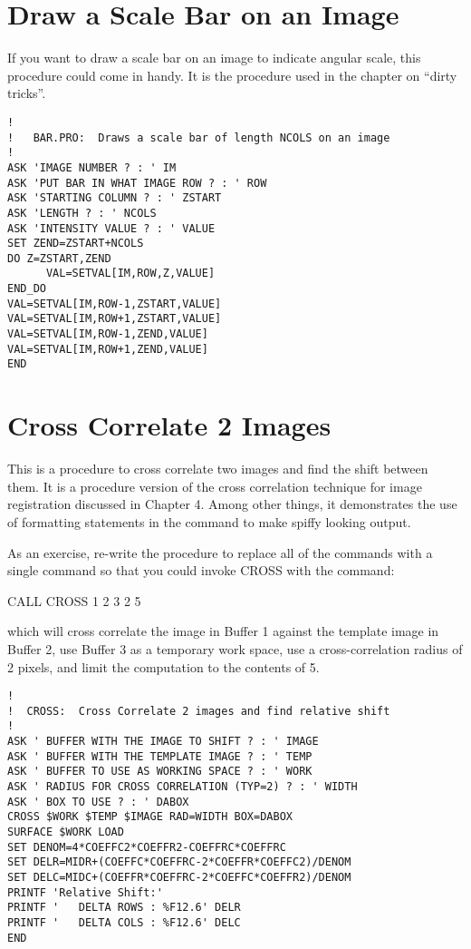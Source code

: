 
\section{Draw a Scale Bar on an Image}

If you want to draw a scale bar on an image to indicate angular scale, this
procedure could come in handy.  It is the procedure used in the
chapter on ``dirty tricks''.

\begin{verbatim}
!
!   BAR.PRO:  Draws a scale bar of length NCOLS on an image
!
ASK 'IMAGE NUMBER ? : ' IM
ASK 'PUT BAR IN WHAT IMAGE ROW ? : ' ROW
ASK 'STARTING COLUMN ? : ' ZSTART
ASK 'LENGTH ? : ' NCOLS
ASK 'INTENSITY VALUE ? : ' VALUE
SET ZEND=ZSTART+NCOLS
DO Z=ZSTART,ZEND
      VAL=SETVAL[IM,ROW,Z,VALUE]
END_DO
VAL=SETVAL[IM,ROW-1,ZSTART,VALUE]
VAL=SETVAL[IM,ROW+1,ZSTART,VALUE]
VAL=SETVAL[IM,ROW-1,ZEND,VALUE]
VAL=SETVAL[IM,ROW+1,ZEND,VALUE]
END
\end{verbatim}


\section{Cross Correlate 2 Images}

This is a procedure to cross correlate two images and find the shift between
them.  It is a procedure version of the cross correlation technique for image
registration discussed in Chapter 4.  Among other things, it demonstrates
the use of formatting statements in the  command to make
spiffy looking output.

As an exercise, re-write the procedure to replace all of the 
commands with a single  command so that you could invoke CROSS
with the command:
\begin{command}
      \item CALL CROSS 1 2 3 2 5
\end{command}
which will cross correlate the image in Buffer 1 against the template image in
Buffer 2, use Buffer 3 as a temporary work space, use a cross-correlation
radius of 2 pixels, and limit the computation to the contents of  5.

\begin{verbatim}
!
!  CROSS:  Cross Correlate 2 images and find relative shift
!
ASK ' BUFFER WITH THE IMAGE TO SHIFT ? : ' IMAGE
ASK ' BUFFER WITH THE TEMPLATE IMAGE ? : ' TEMP
ASK ' BUFFER TO USE AS WORKING SPACE ? : ' WORK
ASK ' RADIUS FOR CROSS CORRELATION (TYP=2) ? : ' WIDTH
ASK ' BOX TO USE ? : ' DABOX
CROSS $WORK $TEMP $IMAGE RAD=WIDTH BOX=DABOX
SURFACE $WORK LOAD
SET DENOM=4*COEFFC2*COEFFR2-COEFFRC*COEFFRC
SET DELR=MIDR+(COEFFC*COEFFRC-2*COEFFR*COEFFC2)/DENOM
SET DELC=MIDC+(COEFFR*COEFFRC-2*COEFFC*COEFFR2)/DENOM
PRINTF 'Relative Shift:'
PRINTF '   DELTA ROWS : %F12.6' DELR
PRINTF '   DELTA COLS : %F12.6' DELC
END
\end{verbatim}

